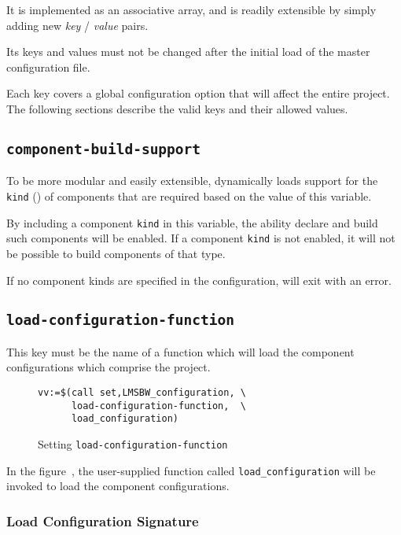 It is implemented as an associative array, and is readily extensible
by simply adding new \emph{key} / \emph{value} pairs.

Its keys and values must not be changed after the initial load of the
master configuration file.

Each key covers a global configuration option that will affect the
entire project.  The following sections describe the valid keys and
their allowed values.


\subsection{\texttt{component-build-support}}\label{variables:component-build-support}

To be more modular and easily extensible, \lmsbw dynamically loads
support for the \texttt{kind} () of components
that are required based on the value of this variable.

By including a component \texttt{kind} in this variable, the ability
declare and build such components will be enabled.  If a component
\texttt{kind} is not enabled, it will not be possible to build
components of that type.

If no component kinds are specified in the configuration, \lmsbw will
exit with an error.

\subsection{\texttt{load-configuration-function}}\label{variables:load-configuration-function}

This key must be the name of a \gnumake function which will load the
component configurations which comprise the project.

\begin{figure}
\hrulefill
\begin{verbatim}
vv:=$(call set,LMSBW_configuration, \
      load-configuration-function,  \
      load_configuration)
\end{verbatim}
\hrulefill
\caption{Setting \texttt{load-configuration-function}}\label{variables:set-load-configuration}
\end{figure}

In the figure~, the
user-supplied function called \texttt{load\_configuration} will be
invoked to load the component configurations.

\subsubsection{Load Configuration Signature}

